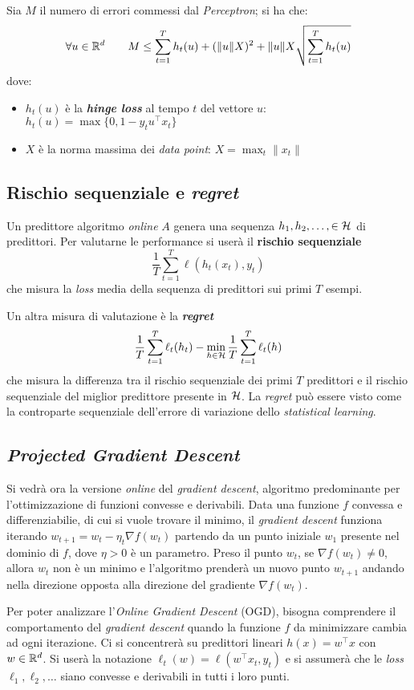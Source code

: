 Sia $M$ il numero di errori commessi dal \textit{Perceptron}; si ha che:
$$\forall u\in\mathbb{R}^d \qquad
M \leq \sum_{t=1}^{T}h_t(u)+(\|u\|X)^2+\|u\|X\sqrt{\sum_{t=1}^{T}h_t(u)} $$
dove:
\begin{itemize}
    \item $h_t(u)$ è la \textbf{\textit{hinge loss}} al tempo $t$ del vettore
        $u$: $h_t(u) = \max{\{0,1-y_tu^\top x_t\}}$
    \item $X$ è la norma massima dei \textit{data point}: $X=\max_t{\|x_t\|}$
\end{itemize}

\subsection{Rischio sequenziale e \textit{regret}}
Un predittore algoritmo \textit{online} $A$ genera una sequenza
$h_1,h_2,\dots,\in\mathcal{H}$ di predittori. Per valutarne le performance si userà
il \textbf{rischio sequenziale}
$$ \frac{1}{T}\sum_{t=1}^{T}\ell(h_t(x_t),y_t) $$
che misura la \textit{loss} media della sequenza di predittori sui primi $T$
esempi.

Un altra misura di valutazione è la \textbf{\textit{regret}}
$$
\frac{1}{T}\sum_{t=1}^{T}\ell_t(h_t)-
\min_{h\in\mathcal{H}}\frac{1}{T}\sum_{t=1}^{T}\ell_t(h)
$$
che misura la differenza tra il rischio sequenziale dei primi $T$ predittori
e il rischio sequenziale del miglior predittore presente in $\mathcal{H}$. La
\textit{regret} può essere visto come la controparte sequenziale dell'errore
di variazione dello \textit{statistical learning}.

\subsection{\textit{Projected Gradient Descent}}
Si vedrà ora la versione \textit{online} del \textit{gradient descent},
algoritmo predominante per l'ottimizzazione di funzioni convesse e derivabili.
Data una funzione $f$ convessa e differenziabilie, di cui si vuole trovare il 
minimo, il \textit{gradient descent} funziona iterando 
$w_{t+1}=w_t-\eta_t\nabla f(w_t)$ partendo da un punto iniziale $w_1$ presente
nel dominio di $f$, dove $\eta>0$ è un parametro. Preso il punto $w_t$, se
$\nabla f(w_t)\neq 0$, allora $w_t$ non è un minimo e l'algoritmo prenderà
un nuovo punto $w_{t+1}$ andando nella direzione opposta alla direzione del
gradiente $\nabla f(w_t)$.

Per poter analizzare l'\textit{Online Gradient Descent} (OGD), bisogna
comprendere il comportamento del \textit{gradient descent} quando la funzione
$f$ da minimizzare cambia ad ogni iterazione. Ci si concentrerà su predittori
lineari $h(x)=w^\top x$ con $w\in\mathbb{R}^d$. Si userà la notazione
$\ell_t(w) = \ell(w^\top x_t,y_t)$ e si assumerà che le \textit{loss}
$\ell_1,\ell_2,\dots$ siano convesse e derivabili in tutti i loro punti.

